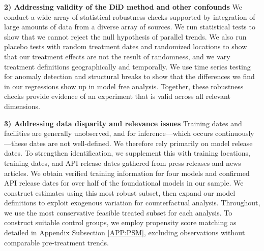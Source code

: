 \documentclass[sigconf,authordraft]{acmart}
\newcommand{\nb}[1]{\textcolor{blue}{NB[#1]}}
\newcommand{\aruna}[1]{\textcolor{blue}{Aruna[#1]}}
\begin{document}
\noindent\textbf{2) Addressing validity of the DiD method and other confounds} We conduct a wide-array of statistical robustness checks supported by integration of large amounts of data from a diverse array of sources. We run statistical tests to show that we cannot reject the null hypothesis of parallel trends. We also run placebo tests with random treatment dates and randomized locations to show that our treatment effects are not the result of randomness, and we vary treatment definitions geographically and temporally. We use time series testing for anomaly detection and structural breaks to show that the differences we find in our regressions show up in model free analysis. Together, these robustness checks provide evidence of an experiment that is valid across all relevant dimensions.

\noindent\textbf{3) Addressing data disparity and relevance issues} 
Training dates and facilities are generally unobserved, and for inference—which occurs continuously—these dates are not well-defined. We therefore rely primarily on model release dates. To strengthen identification, we supplement this with training locations, training dates, and API release dates gathered from press releases and news articles. We obtain verified training information for four models and confirmed API release dates for over half of the foundational models in our sample. We construct estimates using this most robust subset, then expand our model definitions to exploit exogenous variation for counterfactual analysis. Throughout, we use the most conservative feasible treated subset for each analysis. To construct suitable control groups, we employ propensity score matching as detailed in Appendix Subsection \ref{APP:PSM}, excluding observations without comparable pre-treatment trends.

\end{document}
